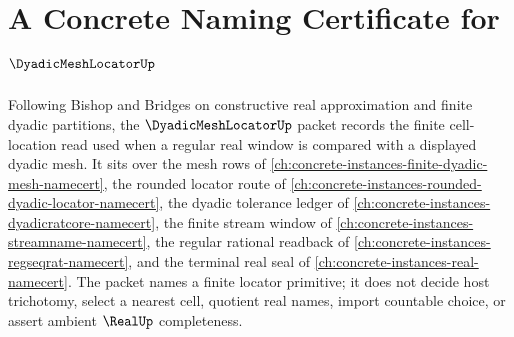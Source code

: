 \chapter{A Concrete Naming Certificate for $\DyadicMeshLocatorUp$}
\label{ch:concrete-instances-dyadic-mesh-locator-namecert}

Following Bishop and Bridges on constructive real approximation and finite dyadic partitions, the $\DyadicMeshLocatorUp$ packet records the finite cell-location read used when a regular real window is compared with a displayed dyadic mesh. It sits over the mesh rows of \autoref{ch:concrete-instances-finite-dyadic-mesh-namecert}, the rounded locator route of \autoref{ch:concrete-instances-rounded-dyadic-locator-namecert}, the dyadic tolerance ledger of \autoref{ch:concrete-instances-dyadicratcore-namecert}, the finite stream window of \autoref{ch:concrete-instances-streamname-namecert}, the regular rational readback of \autoref{ch:concrete-instances-regseqrat-namecert}, and the terminal real seal of \autoref{ch:concrete-instances-real-namecert}. The packet names a finite locator primitive; it does not decide host trichotomy, select a nearest cell, quotient real names, import countable choice, or assert ambient $\RealUp$ completeness.

